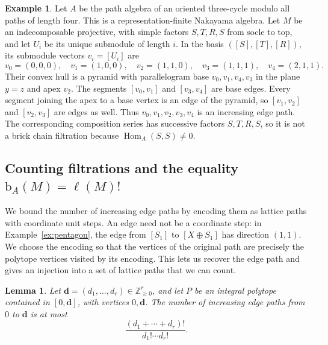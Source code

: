 \documentclass[a4paper,reqno,10pt]{amsart}
\newtheorem{lemma}[theorem]{Lemma}
\theoremstyle{definition}
\newtheorem{example}[theorem]{Example}
\numberwithin{equation}{section}
\newcommand{\Hom}{\operatorname{Hom}}
\newcommand{\bcount}{\mathrm b}
\begin{document}
\begin{example}\label{ex:path-not-filtration}
Let $A$ be the path algebra of an oriented three-cycle modulo all
paths of length four. This is a representation-finite Nakayama algebra.
Let $M$ be an indecomposable projective, with simple factors
$S,T,R,S$ from socle to top, and let $U_i$ be its unique submodule of
length $i$. In the basis $([S],[T],[R])$, its submodule vectors
$v_i=[U_i]$ are
\[
 v_0=(0,0,0),\quad v_1=(1,0,0),\quad v_2=(1,1,0),\quad
 v_3=(1,1,1),\quad v_4=(2,1,1).
\]
Their convex hull is a pyramid with parallelogram base
$v_0,v_1,v_4,v_3$ in the plane $y=z$ and apex $v_2$.
The segments $[v_0,v_1]$ and $[v_3,v_4]$ are base edges.
Every segment joining the apex to a base vertex is an edge of the
pyramid, so $[v_1,v_2]$ and $[v_2,v_3]$ are edges as well.
Thus $v_0,v_1,v_2,v_3,v_4$ is an increasing edge path.
The corresponding composition series has successive factors $S,T,R,S$,
so it is not a brick chain filtration because $\Hom_A(S,S)\ne0$.
\end{example}

\subsection{Counting filtrations and the equality \texorpdfstring{$\bcount_A(M)=\ell(M)!$}{b(M)=length(M)!}}

We bound the number of increasing edge paths by encoding them as
lattice paths with coordinate unit steps. An edge need not be a
coordinate step: in Example~\ref{ex:pentagon}, the edge from $[S_1]$ to
$[X\oplus S_1]$ has direction $(1,1)$. We choose the encoding so
that the vertices of the original path are precisely the polytope
vertices visited by its encoding. This lets us recover the edge path
and gives an injection into a set of lattice paths that we can count.

\begin{lemma}\label{lem:lattice-paths}
Let $\mathbf d=(d_1,\ldots,d_r)\in\mathbb Z_{\geq0}^r$, and let $P$ be an
integral polytope contained in $[0,\mathbf d]$, with vertices $0,\mathbf d$. The number
of increasing edge paths from $0$ to $\mathbf d$ is at most
\[
 \frac{(d_1+\cdots+d_r)!}{d_1!\cdots d_r!}.
\]
\end{lemma}
\end{document}
